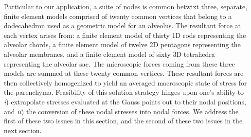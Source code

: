 Particular to our application, a suite of nodes is common betwixt three, separate, finite element models comprised of twenty common vertices that belong to a dodecahedron used as a geometric model for an alveolus.  The resultant force at each vertex arises from: a finite element model of thirty 1D rods representing the alveolar chords, a finite element model of twelve 2D pentagons representing the alveolar membranes, and a finite element model of sixty 3D tetrahedra representing the alveolar sac.  The micro\-scopic forces coming from these three models are summed at these twenty common vertices. These resultant forces are then collectively homogenized to yield an averaged macroscopic state of stress for the parenchyma.  Feasibility of this solution strategy hinges upon one's ability to \textit{i\/}) extrapolate stresses evaluated at the Gauss points out to their nodal positions, and \textit{ii\/}) the conversion of these nodal stresses into nodal forces.  We address the first of these two issues in this section, and the second of these two issues in the next section.

